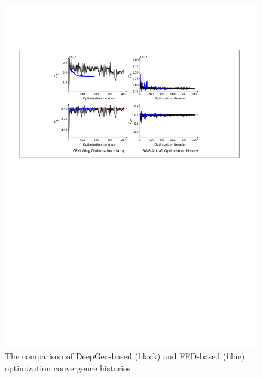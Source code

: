 
\begin{figure}[tbh]
    \begin{center}
        \includegraphics[width=1\linewidth]{chapter5/fig/ffd_history_comparison.pdf}
    \end{center}
    \vspace{-3mm}
    \caption{
        \small The comparison of DeepGeo-based (black) and FFD-based (blue) optimization convergence histories.
    }
    \label{ch5:fig:ffd_history_comparison}
\end{figure}